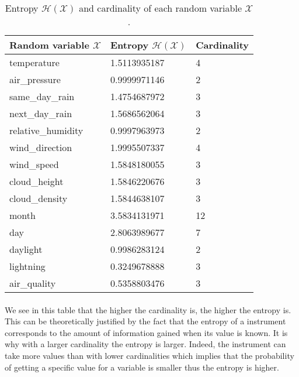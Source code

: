 \documentclass[a4paper, 11pt, oneside]{article}
\begin{document}
\begin{table}[H]
    \centering
    \begin{tabular}{|l|l|l|}
    \hline
    \textbf{Random variable $\mathcal{X}$} & \textbf{Entropy $\mathcal{H}(\mathcal{X})$} & \textbf{Cardinality} \\ \hline
    temperature            & 1.5113935187            & 4                    \\ \hline
    air\_pressure          & 0.9999971146             & 2                    \\ \hline
    same\_day\_rain        & 1.4754687972            & 3                    \\ \hline
    next\_day\_rain        & 1.5686562064            & 3                    \\ \hline
    relative\_humidity     & 0.9997963973            & 2                    \\ \hline
    wind\_direction        & 1.9995507337            & 4                    \\ \hline
    wind\_speed            & 1.5848180055            & 3                    \\ \hline
    cloud\_height          & 1.5846220676            & 3                    \\ \hline
    cloud\_density         & 1.5844638107            & 3                    \\ \hline
    month                  & 3.5834131971            & 12                   \\ \hline
    day                    & 2.8063989677            & 7                    \\ \hline
    daylight               & 0.9986283124            & 2                    \\ \hline
    lightning              & 0.3249678888            & 3                    \\ \hline
    air\_quality           & 0.5358803476            & 3                    \\ \hline
    \end{tabular}
    \caption{Entropy $\mathcal{H}(\mathcal{X})$ and cardinality of each random variable $\mathcal{X}$.}
    \label{table:q6}
    \end{table}

\paragraph{}We see in this table that the higher the cardinality is, the higher the entropy is. This can be theoretically justified by the fact that the 
entropy of a instrument corresponds to the amount of information gained when its value is known. It is why with a larger cardinality the entropy is larger. Indeed,
the instrument can take more values than with lower cardinalities which implies that the probability of getting a specific value for a variable is smaller thus the entropy is higher.
\end{document}
